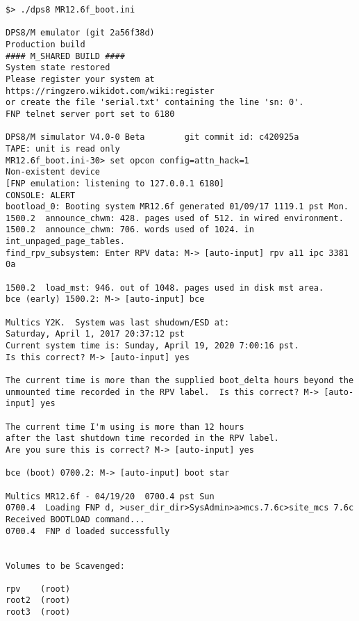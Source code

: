 \begin{lstlisting}
$> ./dps8 MR12.6f_boot.ini 

DPS8/M emulator (git 2a56f38d)
Production build
#### M_SHARED BUILD ####
System state restored
Please register your system at https://ringzero.wikidot.com/wiki:register
or create the file 'serial.txt' containing the line 'sn: 0'.
FNP telnet server port set to 6180

DPS8/M simulator V4.0-0 Beta        git commit id: c420925a
TAPE: unit is read only
MR12.6f_boot.ini-30> set opcon config=attn_hack=1
Non-existent device
[FNP emulation: listening to 127.0.0.1 6180]
CONSOLE: ALERT
bootload_0: Booting system MR12.6f generated 01/09/17 1119.1 pst Mon.   
1500.2  announce_chwm: 428. pages used of 512. in wired environment.
1500.2  announce_chwm: 706. words used of 1024. in int_unpaged_page_tables.
find_rpv_subsystem: Enter RPV data: M-> [auto-input] rpv a11 ipc 3381 0a

1500.2  load_mst: 946. out of 1048. pages used in disk mst area.
bce (early) 1500.2: M-> [auto-input] bce

Multics Y2K.  System was last shudown/ESD at:
Saturday, April 1, 2017 20:37:12 pst
Current system time is: Sunday, April 19, 2020 7:00:16 pst.
Is this correct? M-> [auto-input] yes

The current time is more than the supplied boot_delta hours beyond the
unmounted time recorded in the RPV label.  Is this correct? M-> [auto-input] yes

The current time I'm using is more than 12 hours
after the last shutdown time recorded in the RPV label.
Are you sure this is correct? M-> [auto-input] yes

bce (boot) 0700.2: M-> [auto-input] boot star

Multics MR12.6f - 04/19/20  0700.4 pst Sun
0700.4  Loading FNP d, >user_dir_dir>SysAdmin>a>mcs.7.6c>site_mcs 7.6c
Received BOOTLOAD command...
0700.4  FNP d loaded successfully


Volumes to be Scavenged:

rpv    (root)
root2  (root)
root3  (root)


\end{lstlisting}
